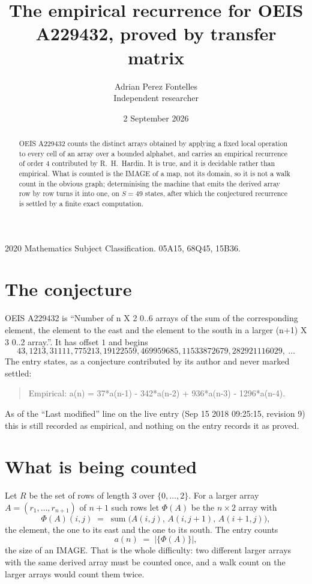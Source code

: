 \documentclass[11pt,a4paper]{article}
\title{The empirical recurrence for OEIS A229432, proved by transfer matrix}
\author{Adrian Perez Fontelles\\ \small Independent researcher}
\date{2 September 2026}
\theoremstyle{plain}
\theoremstyle{definition}
\begin{document}
\maketitle

\begin{abstract}
OEIS A229432 counts the distinct arrays obtained by applying a fixed local operation to every cell
of an array over a bounded alphabet, and carries an empirical recurrence of order $4$
contributed by R.~H.~Hardin. It is true, and it is decidable rather than empirical. What is
counted is the IMAGE of a map, not its domain, so it is not a walk count in the obvious graph;
determinising the machine that emits the derived array row by row turns it into one, on
$S=49$ states, after which the conjectured recurrence is settled by a finite exact
computation.
\end{abstract}

\noindent\small 2020 Mathematics Subject Classification. 05A15, 68Q45, 15B36.\normalsize

\section{The conjecture}

OEIS A229432 is ``Number of n X 2 0..6 arrays of the sum of the corresponding element, the element to the east and the element to the south in a larger (n+1) X 3 0..2 array.''. It has offset $1$ and begins
\[
43, 1213, 31111, 775213, 19122559, 469959685, 11533872679, 282921116029,\ \dots
\]
The entry states, as a conjecture contributed by its author and never marked settled:
\begin{quote}
Empirical: a(n) = 37*a(n-1) - 342*a(n-2) + 936*a(n-3) - 1296*a(n-4).
\end{quote}
As of the ``Last modified'' line on the live entry (Sep 15 2018 09:25:15, revision 9) this is still
recorded as empirical, and nothing on the entry records it as proved.

\section{What is being counted}

Let $R$ be the set of rows of length $3$ over $\{0,\dots,2\}$.
For a larger array $A=(r_1,\dots,r_{n+1})$ of $n+1$ such rows let $\Phi(A)$ be the
$n\times2$ array with
\[
\Phi(A)(i,j)\;=\;\operatorname{sum}\bigl(A(i,j),\,A(i,j+1),\,A(i+1,j)\bigr),
\]
the element, the one to its east and the one to its south. The entry counts
\[
a(n)\;=\;\bigl|\{\Phi(A)\}\bigr| ,
\]
the size of an IMAGE. That is the whole difficulty: two different larger arrays with the same
derived array must be counted once, and a walk count on the larger arrays would count them
twice.
\end{document}
